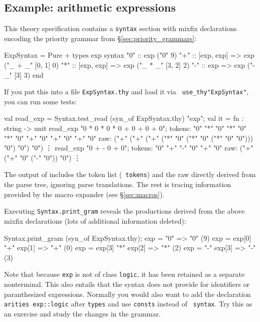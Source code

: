 \subsection{Example: arithmetic expressions}
This theory specification contains a {\tt syntax} section with mixfix
declarations encoding the priority grammar from
\S\ref{sec:priority_grammars}:
\begin{ttbox}
ExpSyntax = Pure +
types
  exp
syntax
  "0" :: exp                 ("0"      9)
  "+" :: [exp, exp] => exp   ("_ + _"  [0, 1] 0)
  "*" :: [exp, exp] => exp   ("_ * _"  [3, 2] 2)
  "-" :: exp => exp          ("- _"    [3] 3)
end
\end{ttbox}
If you put this into a file {\tt ExpSyntax.thy} and load it via {\tt
  use_thy"ExpSyntax"}, you can run some tests:
\begin{ttbox}
val read_exp = Syntax.test_read (syn_of ExpSyntax.thy) "exp";
{\out val it = fn : string -> unit}
read_exp "0 * 0 * 0 * 0 + 0 + 0 + 0";
{\out tokens: "0" "*" "0" "*" "0" "*" "0" "+" "0" "+" "0" "+" "0"}
{\out raw: ("+" ("+" ("+" ("*" "0" ("*" "0" ("*" "0" "0"))) "0") "0") "0")}
{\out \vdots}
read_exp "0 + - 0 + 0";
{\out tokens: "0" "+" "-" "0" "+" "0"}
{\out raw: ("+" ("+" "0" ("-" "0")) "0")}
{\out \vdots}
\end{ttbox}
The output of  includes the token list ({\tt
  tokens}) and the raw \AST{} directly derived from the parse tree,
ignoring parse \AST{} translations.  The rest is tracing information
provided by the macro expander (see \S\ref{sec:macros}).

Executing {\tt Syntax.print_gram} reveals the productions derived from the
above mixfix declarations (lots of additional information deleted):
\begin{ttbox}
Syntax.print_gram (syn_of ExpSyntax.thy);
{\out exp = "0"  => "0" (9)}
{\out exp = exp[0] "+" exp[1]  => "+" (0)}
{\out exp = exp[3] "*" exp[2]  => "*" (2)}
{\out exp = "-" exp[3]  => "-" (3)}
\end{ttbox}

Note that because {\tt exp} is not of class {\tt logic}, it has been
retained as a separate nonterminal. This also entails that the syntax
does not provide for identifiers or paranthesized expressions.
Normally you would also want to add the declaration {\tt arities
  exp::logic} after {\tt types} and use {\tt consts} instead of {\tt
  syntax}. Try this as an exercise and study the changes in the
grammar.

